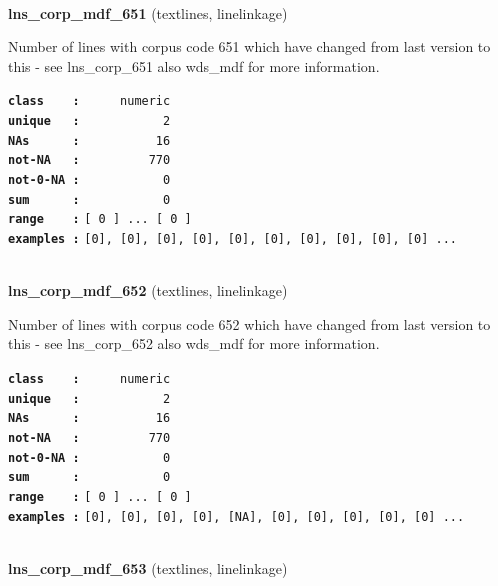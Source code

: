 \documentclass[]{article}
\begin{document}
~

\textbf{lns\_corp\_mdf\_651} (textlines, linelinkage)

Number of lines with corpus code 651 which have changed from last
version to this - see lns\_corp\_651 also wds\_mdf for more information.

\textbf{\texttt{class\ \ \ \ :}} \texttt{~~~~~numeric}\\
\textbf{\texttt{unique\ \ \ :}} \texttt{~~~~~~~~~~~2}\\
\textbf{\texttt{NAs\ \ \ \ \ \ :}} \texttt{~~~~~~~~~~16}\\
\textbf{\texttt{not-NA\ \ \ :}} \texttt{~~~~~~~~~770}\\
\textbf{\texttt{not-0-NA\ :}} \texttt{~~~~~~~~~~~0}\\
\textbf{\texttt{sum\ \ \ \ \ \ :}} \texttt{~~~~~~~~~~~0}\\
\textbf{\texttt{range\ \ \ \ :}}
\texttt{{[}\ 0\ {]}\ ...\ {[}\ 0\ {]}}\\
\textbf{\texttt{examples\ :}}
\texttt{{[}0{]},\ {[}0{]},\ {[}0{]},\ {[}0{]},\ {[}0{]},\ {[}0{]},\ {[}0{]},\ {[}0{]},\ {[}0{]},\ {[}0{]}\ ...}\\

~

\textbf{lns\_corp\_mdf\_652} (textlines, linelinkage)

Number of lines with corpus code 652 which have changed from last
version to this - see lns\_corp\_652 also wds\_mdf for more information.

\textbf{\texttt{class\ \ \ \ :}} \texttt{~~~~~numeric}\\
\textbf{\texttt{unique\ \ \ :}} \texttt{~~~~~~~~~~~2}\\
\textbf{\texttt{NAs\ \ \ \ \ \ :}} \texttt{~~~~~~~~~~16}\\
\textbf{\texttt{not-NA\ \ \ :}} \texttt{~~~~~~~~~770}\\
\textbf{\texttt{not-0-NA\ :}} \texttt{~~~~~~~~~~~0}\\
\textbf{\texttt{sum\ \ \ \ \ \ :}} \texttt{~~~~~~~~~~~0}\\
\textbf{\texttt{range\ \ \ \ :}}
\texttt{{[}\ 0\ {]}\ ...\ {[}\ 0\ {]}}\\
\textbf{\texttt{examples\ :}}
\texttt{{[}0{]},\ {[}0{]},\ {[}0{]},\ {[}0{]},\ {[}NA{]},\ {[}0{]},\ {[}0{]},\ {[}0{]},\ {[}0{]},\ {[}0{]}\ ...}\\

~

\textbf{lns\_corp\_mdf\_653} (textlines, linelinkage)
\end{document}
